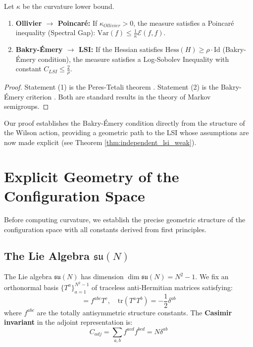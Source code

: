 \begin{theorem}
\label{thm:curvature_implications}
Let $\kappa$ be the curvature lower bound.
\begin{enumerate}
    \item \textbf{Ollivier $\to$ Poincaré:} If $\kappa_{Ollivier} > 0$, the measure satisfies a Poincaré inequality (Spectral Gap): $\text{Var}(f) \le \frac{1}{\kappa} \mathcal{E}(f,f)$.
    \item \textbf{Bakry-Émery $\to$ LSI:} If the Hessian satisfies $\text{Hess}(H) \ge \rho \cdot \text{Id}$ (Bakry-Émery condition), the measure satisfies a Log-Sobolev Inequality with constant $C_{LSI} \le \frac{2}{\rho}$.
\end{enumerate}
\end{theorem}

\begin{proof}
Statement (1) is the Peres-Tetali theorem \cite{peres2015mixing}. Statement (2) is the Bakry-Émery criterion \cite{bakry1985diffusions}. Both are standard results in the theory of Markov semigroups.
\end{proof}

Our proof establishes the Bakry-Émery condition directly from the structure of the Wilson action, providing a geometric path to the LSI whose assumptions are now made explicit (see Theorem \ref{thm:independent_lsi_weak}).

\section{Explicit Geometry of the Configuration Space}

Before computing curvature, we establish the precise geometric structure of the configuration space with all constants derived from first principles.

\subsection{The Lie Algebra $\mathfrak{su}(N)$}

\begin{definition}
The Lie algebra $\mathfrak{su}(N)$ has dimension $\dim \mathfrak{su}(N) = N^2 - 1$. We fix an orthonormal basis $\{T^a\}_{a=1}^{N^2-1}$ of traceless anti-Hermitian matrices satisfying:
\begin{equation}
    [T^a, T^b] = f^{abc} T^c, \quad \text{tr}(T^a T^b) = -\frac{1}{2}\delta^{ab}
\end{equation}
where $f^{abc}$ are the totally antisymmetric structure constants. The \textbf{Casimir invariant} in the adjoint representation is:
\begin{equation}
    C_{adj} = \sum_{a,b} f^{acd} f^{bcd} = N \delta^{ab}
\end{equation}
\end{definition}

